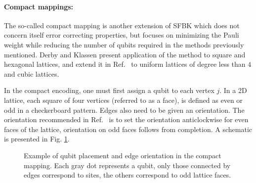 \paragraph{Compact mappings:}

The so-called compact mapping \cite{Derby2021} is another extension of SFBK which does not concern itself error correcting properties, but focuses on minimizing the Pauli weight while reducing the number of qubits required in the methods previously mentioned. Derby and Klassen \cite{Derby2021} present application of the method to square and hexagonal lattices, and extend it in  Ref.~\cite{Derby2021_part2} to uniform lattices of degree less than $4$ and cubic lattices. 

In the compact encoding, one must first assign a qubit to each vertex $j$. In a 2D lattice, each square of four vertices (referred to as a face), is defined as even or odd in a checkerboard pattern. Edges also need to be given an orientation. The orientation recommended in Ref.~\cite{Derby2021_part2} is to set the orientation anticlockwise for even faces of the lattice, orientation on odd faces follows from completion. A schematic is presented in Fig. \ref{fig:compact_encoding}.

\begin{figure} [h]
\centering
{}
\caption{Example of qubit placement and edge orientation in the compact mapping. Each gray dot represents a qubit, only those connected by edges correspond to sites, the others correspond to odd lattice faces.}
\label{fig:compact_encoding}
\end{figure}

